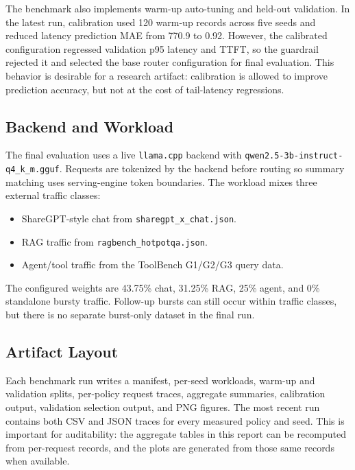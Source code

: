 \documentclass[10pt,twocolumn]{article}
\begin{document}
The benchmark also implements warm-up auto-tuning and held-out validation. In the latest run, calibration used 120 warm-up records across five seeds and reduced latency prediction MAE from 770.9 to 0.92. However, the calibrated configuration regressed validation p95 latency and TTFT, so the guardrail rejected it and selected the base router configuration for final evaluation. This behavior is desirable for a research artifact: calibration is allowed to improve prediction accuracy, but not at the cost of tail-latency regressions.

\subsection{Backend and Workload}

The final evaluation uses a live \texttt{llama.cpp} backend with \texttt{qwen2.5-3b-instruct-q4\_k\_m.gguf}. Requests are tokenized by the backend before routing so summary matching uses serving-engine token boundaries. The workload mixes three external traffic classes:

\begin{itemize}[leftmargin=*]
\item ShareGPT-style chat from \texttt{sharegpt\_x\_chat.json}.
\item RAG traffic from \texttt{ragbench\_hotpotqa.json}.
\item Agent/tool traffic from the ToolBench G1/G2/G3 query data.
\end{itemize}

The configured weights are 43.75\% chat, 31.25\% RAG, 25\% agent, and 0\% standalone bursty traffic. Follow-up bursts can still occur within traffic classes, but there is no separate burst-only dataset in the final run.

\subsection{Artifact Layout}

Each benchmark run writes a manifest, per-seed workloads, warm-up and validation splits, per-policy request traces, aggregate summaries, calibration output, validation selection output, and PNG figures. The most recent run contains both CSV and JSON traces for every measured policy and seed. This is important for auditability: the aggregate tables in this report can be recomputed from per-request records, and the plots are generated from those same records when available.
\end{document}
